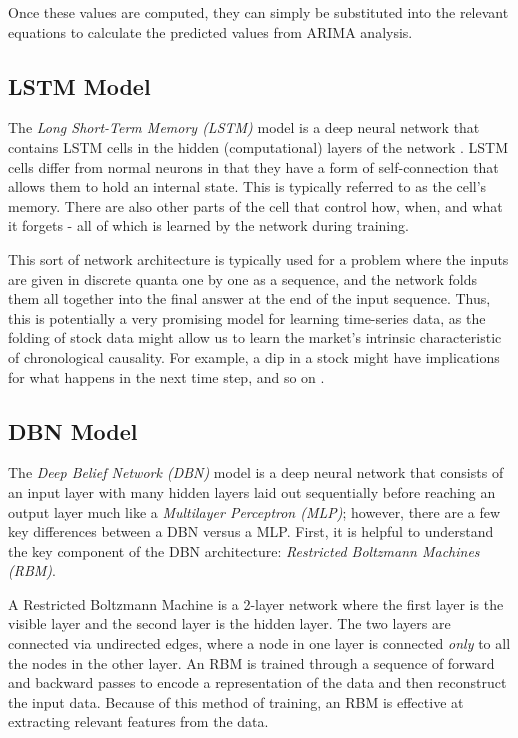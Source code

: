 \documentclass[conference]{IEEEtran}
\begin{document}
Once these values are computed, they can simply be substituted into the relevant equations to calculate the predicted values from ARIMA analysis.

\subsection{LSTM Model}
The \textit{Long Short-Term Memory (LSTM)} model is a deep neural network that contains LSTM cells in the hidden (computational) layers of the network \cite{brownlee2016time}.
LSTM cells differ from normal neurons in that they have a form of self-connection that allows them to hold an internal state.
This is typically referred to as the cell's memory.
There are also other parts of the cell that control how, when, and what it forgets - all of which is learned by the network during training.

This sort of network architecture is typically used for a problem where the inputs are given in discrete quanta one by one as a sequence, and the network folds them all together into the final answer at the end of the input sequence.
Thus, this is potentially a very promising model for learning time-series data, as the folding of stock data might allow us to learn the market's intrinsic characteristic of chronological causality.
For example, a dip in a stock might have implications for what happens in the next time step, and so on \cite{olah2015understanding}.

\subsection{DBN Model}
The \textit{Deep Belief Network (DBN)} model is a deep neural network that consists of an input layer with many hidden layers laid out sequentially before reaching an output layer much like a \textit{Multilayer Perceptron (MLP)}; however, there are a few key differences between a DBN versus a MLP.
First, it is helpful to understand the key component of the DBN architecture: \textit{Restricted Boltzmann Machines (RBM)}.

A Restricted Boltzmann Machine is a 2-layer network where the first layer is the visible layer and the second layer is the hidden layer.
The two layers are connected via undirected edges, where a node in one layer is connected \textit{only} to all the nodes in the other layer.
An RBM is trained through a sequence of forward and backward passes to encode a representation of the data and then reconstruct the input data\cite{hinton}.
Because of this method of training, an RBM is effective at extracting relevant features from the data.
\end{document}

